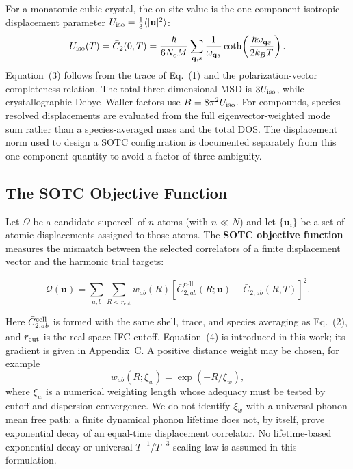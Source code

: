 \documentclass[aps,prb,reprint,amsmath,amssymb,floatfix]{revtex4-2}
\begin{document}
\color{revisionblue}
For a monatomic cubic crystal, the on-site value is the one-component
isotropic displacement parameter
\(U_{\rm iso}=\frac13\langle|\mathbf u|^2\rangle\):
\begin{equation}
U_{\rm iso}(T)=\bar C_2(0,T)=
\frac{\hbar}{6N_cM}\sum_{\mathbf q,s}
\frac{1}{\omega_{\mathbf q s}}
\coth\!\left(\frac{\hbar\omega_{\mathbf q s}}{2k_BT}\right).
\end{equation}
Equation~(3) follows from the trace of Eq.~(1) and the polarization-vector
completeness relation. The total three-dimensional MSD is
\(3U_{\rm iso}\), while crystallographic Debye--Waller factors use
\(B=8\pi^2U_{\rm iso}\). For compounds, species-resolved displacements are
evaluated from the full eigenvector-weighted mode sum rather than a
species-averaged mass and the total DOS. The displacement norm used to design
a SOTC configuration is documented separately from this one-component
quantity to avoid a factor-of-three ambiguity.
\color{black}

\subsection{The SOTC Objective
Function}\label{the-sotc-objective-function}

\color{revisionblue}
Let \(\Omega\) be a candidate supercell of \(n\) atoms (with
\(n \ll N\)) and let \(\{\mathbf{u}_i\}\) be a set of atomic
displacements assigned to those atoms.
The \textbf{SOTC objective function} measures the mismatch between the
selected correlators of a finite displacement vector and the harmonic trial
targets:
\color{black}

\color{revisionblue}
\begin{equation}
\mathcal{Q}(\mathbf{u}) = \sum_{a,b}\sum_{R<r_\text{cut}} w_{ab}(R)
\left[\bar{C}_{2,ab}^\text{cell}(R;\mathbf u)
- \bar{C}_{2,ab}(R,T)\right]^2 .
\end{equation}
\color{black}

\color{revisionblue}
Here \(\bar C_{2,ab}^{\rm cell}\) is formed with the same shell, trace, and
species averaging as Eq.~(2), and \(r_{\rm cut}\) is the real-space IFC
cutoff. Equation~(4) is introduced in this work; its gradient is given in
Appendix~C. A positive distance weight may be chosen, for example
\begin{equation}
w_{ab}(R;\xi_w)=\exp(-R/\xi_w),
\end{equation}
where \(\xi_w\) is a numerical weighting length whose adequacy must be tested
by cutoff and dispersion convergence. We do not identify \(\xi_w\) with a
universal phonon mean free path: a finite dynamical phonon lifetime does not,
by itself, prove exponential decay of an equal-time displacement correlator.
No lifetime-based exponential decay or universal
\(T^{-1}\)/\(T^{-3}\) scaling law is assumed in this formulation.
\color{black}
\end{document}
